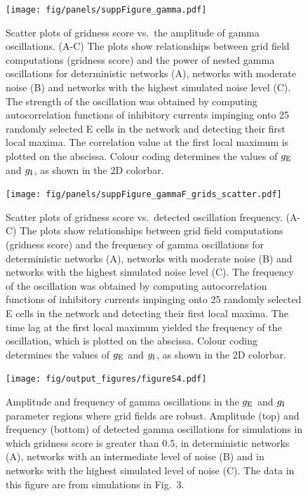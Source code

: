 \documentclass[a4paper,12pt]{article}
\newcommand{\ssc}[3]{\ensuremath{#1_{\text{#2}_{\text{#3}}}}}
\newcommand{\gE      }{\ssc{g}      {\scriptsize{E}}{}}
\newcommand{\gI      }{\ssc{g}      {\scriptsize{I}}{}}
\begin{document}
\begin{figure}[p]
    \internallinenumbers
    \centering
        \texttt{[image: fig/panels/suppFigure\_gamma.pdf]}
    \caption{Scatter plots of gridness score vs.\ the amplitude of gamma
    oscillations. (A-C) The plots show relationships between grid field
    computations (gridness score) and the power of nested gamma oscillations
    for deterministic networks (A), networks with moderate noise (B) and
    networks with the highest simulated noise level (C).
    The strength of the oscillation was obtained
    by computing autocorrelation functions of inhibitory currents impinging
    onto 25 randomly selected E cells in the network and detecting their first
    local maxima. The correlation value at the first local maximum is plotted
    on the abscissa. Colour coding determines the values of $\gE$ and $\gI$, as
    shown in the 2D colorbar.}
\end{figure}

\clearpage

\begin{figure}[ht!]
    \internallinenumbers
    \centering
        \texttt{[image: fig/panels/suppFigure\_gammaF\_grids\_scatter.pdf]}
    \caption{Scatter plots of gridness score vs.\ detected oscillation
    frequency.  (A-C) The plots show relationships between grid field
    computations (gridness score) and the frequency of gamma oscillations for
    deterministic networks (A), networks with moderate noise (B) and networks
    with the highest simulated noise level (C).  The frequency of the
    oscillation was obtained by computing autocorrelation functions of
    inhibitory currents impinging onto 25 randomly selected E cells in the
    network and detecting their first local maxima.  The time lag at the first
    local maximum yielded the frequency of the oscillation, which is plotted on
    the abscissa. Colour coding determines the values of $\gE$ and $\gI$, as
    shown in the 2D colorbar.}
\end{figure}

\clearpage

\begin{figure}[p]
    \internallinenumbers
    \centering
        \texttt{[image: fig/output\_figures/figureS4.pdf]}
    \caption{Amplitude and frequency of gamma oscillations in the $\gE$ and
    $\gI$ parameter regions where grid fields are robust. Amplitude (top) and
    frequency (bottom) of detected gamma oscillations for simulations in which
    gridness score is greater than 0.5, in deterministic networks (A), networks
    with an intermediate level of noise (B) and in networks with the highest
    simulated level of noise (C). The data in this figure are from simulations
    in Fig.~3.}
\end{figure}
\end{document}
